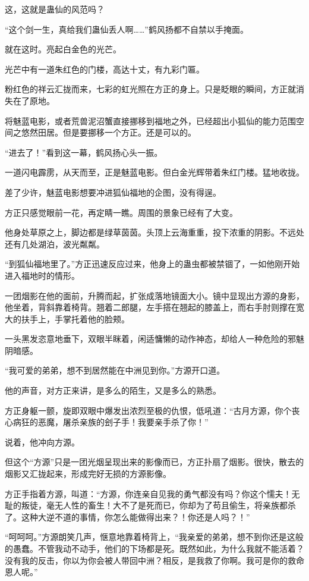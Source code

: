 \begin{this_body}
这，这就是蛊仙的风范吗？

“这个剑一生，真给我们蛊仙丢人啊……”鹤风扬都不自禁以手掩面。

就在这时。亮起白金色的光芒。

光芒中有一道朱红色的门楼，高达十丈，有九彩门匾。

粉红色的祥云汇拢而来，七彩的虹光照在方正的身上。只是眨眼的瞬间，方正就消失在了原地。

将魅蓝电影，或者荒兽泥沼蟹直接挪移到福地之外，已经超出小狐仙的能力范围空间之悠然田居。但是要挪移一个方正。还是可以的。

“进去了！”看到这一幕，鹤风扬心头一振。

一道闪电霹雳，从天而至，正是魅蓝电影。但白金光辉带着朱红门楼。猛地收拢。

差了少许，魅蓝电影想要冲进狐仙福地的企图，没有得逞。

方正只感觉眼前一花，再定睛一瞧。周围的景象已经有了大变。

他身处草原之上，脚边都是绿草茵茵。头顶上云海重重，投下浓重的阴影。不远处还有几处湖泊，波光粼粼。

“到狐仙福地里了。”方正迅速反应过来，他身上的蛊虫都被禁锢了，一如他刚开始进入福地时的情形。

一团烟影在他的面前，升腾而起，扩张成落地镜面大小。镜中显现出方源的身影，他坐着，背斜靠着椅背。翘着二郎腿，左手搭在翘起的膝盖上，而右手肘则撑在宽大的扶手上，手掌托着他的脸颊。

一头黑发恣意地垂下，双眼半眯着，闲适慵懒的动作神态，却给人一种危险的邪魅阴暗感。

“我可爱的弟弟，想不到居然能在中洲见到你。”方源开口道。

他的声音，对方正来讲，是多么的陌生，又是多么的熟悉。

方正身躯一颤，旋即双眼中爆发出浓烈至极的仇恨，低吼道：“古月方源，你个丧心病狂的恶魔，屠杀亲族的刽子手！我要亲手杀了你！”

说着，他冲向方源。

但这个“方源”只是一团光烟呈现出来的影像而已，方正扑扇了烟影。很快，散去的烟影又汇拢起来，形成完好无损的方源影像。

方正手指着方源，叫道：“方源，你连亲自见我的勇气都没有吗？你这个懦夫！无耻的叛徒，毫无人性的畜生！大不了是死而已，你却为了苟且偷生，将亲族都杀了。这种大逆不道的事情，你怎么能做得出来？！你还是人吗？！”

“呵呵呵。”方源朗笑几声，惬意地靠着椅背上，“我亲爱的弟弟，想不到你还是这般的愚蠢。不管我动不动手，他们的下场都是死。既然如此，为什么我就不能活着？没有我的反击，你以为你会被人带回中洲？相反，是我救了你啊。我可是你的救命恩人呢。”


\end{this_body}
